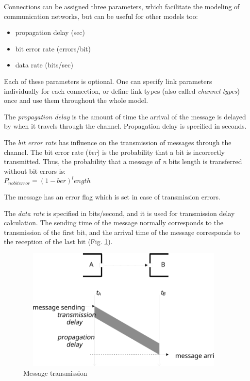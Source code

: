 
Connections can be assigned three parameters, which facilitate
the modeling of communication networks, but can be useful for
other models too:
\begin{itemize}
  \item{propagation delay (sec)}
  \item{bit error rate (errors/bit)}
  \item{data rate (bits/sec)}
\end{itemize}


Each of these parameters is optional. One can specify link parameters
individually for each connection, or define link types (also
called \textit{channel} \textit{types}) once and use them throughout the
whole model.

The \textit{propagation delay} is the amount of time the arrival of
the message is delayed by when it travels through the channel.
Propagation delay is specified in seconds.

The \textit{bit error rate} has influence on the transmission of messages
through the channel. The bit error rate (\textit{ber}) is the probability that
a bit is incorrectly transmitted. Thus, the probability that
a message of \textit{n} bits length is transferred without bit errors is:\\

$P_{no bit error} = (1 - ber)^length$

The message has an error flag which is set in case of transmission
errors.

The \textit{data rate} is specified in bits/second, and it is used
for transmission delay calculation. The sending time of the message
normally corresponds to the transmission of the first bit, and
the arrival time of the message corresponds to the reception
of the last bit (Fig. \ref{fig:ch-overview:message-transm}).

\begin{figure}[htbp]
\begin{center}
\includegraphics[width=4.301in, height=2.417in]{figures/simple-transmission}
\caption{Message transmission}
\label{fig:ch-overview:message-transm}
\end{center}
\end{figure}

